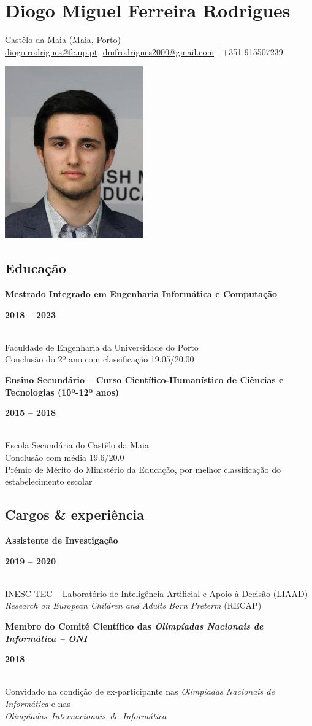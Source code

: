 \documentclass[8pt]{extarticle}
\newcommand{\parag}[1]{
\begin{minipage}{\textwidth} \hfill
\begin{minipage}{\dimexpr\textwidth-0.6cm}
	#1
\end{minipage}
\end{minipage}
}
\newcommand{\itemtime}[2]{
#1 \hfill \begin{minipage}[t]{0.185\textwidth}         #2  \end{minipage}
}
\newcommand{\job}[3]{\parag{
\itemtime{\textbf{#1}}{\textbf{#2}}\\
#3 \vspace*{9px}}}
\begin{document}
\thispagestyle{empty}
\noindent
\begin{minipage}[l]{0.75\textwidth}
	\section*{Diogo Miguel Ferreira Rodrigues}
	Castêlo da Maia (Maia, Porto)\\
    \href{mailto:diogo.rodrigues@fe.up.pt}{diogo.rodrigues@fe.up.pt}, \href{mailto:dmfrodrigues2000@gmail.com}{dmfrodrigues2000@gmail.com} | +351 915507239
\end{minipage}%
\begin{minipage}[l]{0.24\textwidth}
	\begin{center} \includegraphics[scale=1]{cv_photo.jpg} \end{center}
\end{minipage}
\subsection*{Educação}
\job{Mestrado Integrado em Engenharia Informática e Computação}{2018 – 2023}{
Faculdade de Engenharia da Universidade do Porto\\
Conclusão do 2º ano com classificação 19.05/20.00
}
\job{Ensino Secundário – Curso Científico-Humanístico de Ciências e Tecnologias (10º-12º anos)}{2015 – 2018}{
Escola Secundária do Castêlo da Maia\\
Conclusão com média 19.6/20.0\\
Prémio de Mérito do Ministério da Educação, por melhor classificação do estabelecimento escolar
}
\subsection*{Cargos \& experiência}
\job{Assistente de Investigação}{2019 – 2020}{
INESC-TEC – Laboratório de Inteligência Artificial e Apoio à Decisão (LIAAD)\\
\textit{Research on European Children and Adults Born Preterm} (RECAP)
}
\job{Membro do Comité Científico das \textit{Olimpíadas Nacionais de Informática – ONI}}{2018 – }{
Convidado na condição de ex-participante nas \textit{Olimpíadas Nacionais de Informática} e nas \\
\mbox{\textit{Olimpíadas Internacionais de Informática}}
}
\end{document}
